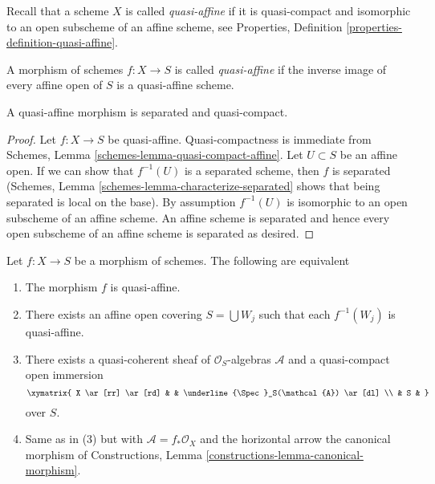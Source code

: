 \noindent
Recall that a scheme $X$ is called {\it quasi-affine} if it is quasi-compact
and isomorphic to an open subscheme of an affine scheme, see
Properties, Definition \ref{properties-definition-quasi-affine}.

\begin{definition}
\label{definition-quasi-affine}
A morphism of schemes $f : X \to S$ is called {\it quasi-affine} if the
inverse image of every affine open of $S$ is a quasi-affine scheme.
\end{definition}

\begin{lemma}
\label{lemma-quasi-affine-separated}
A quasi-affine morphism is separated and quasi-compact.
\end{lemma}

\begin{proof}
Let $f : X \to S$ be quasi-affine.
Quasi-compactness is immediate from
Schemes, Lemma \ref{schemes-lemma-quasi-compact-affine}.
Let $U \subset S$ be an affine open. If we can show that
$f^{-1}(U)$ is a separated scheme, then $f$ is separated
(Schemes, Lemma \ref{schemes-lemma-characterize-separated}
shows that being separated is local on the base).
By assumption $f^{-1}(U)$ is isomorphic to an open subscheme
of an affine scheme. An affine scheme is separated and hence
every open subscheme of an affine scheme is separated as desired.
\end{proof}

\begin{lemma}
\label{lemma-characterize-quasi-affine}
Let $f : X \to S$ be a morphism of schemes.
The following are equivalent
\begin{enumerate}
\item The morphism $f$ is quasi-affine.
\item There exists an affine open covering $S = \bigcup W_j$
such that each $f^{-1}(W_j)$ is quasi-affine.
\item There exists a quasi-coherent sheaf of $\mathcal{O}_S$-algebras
$\mathcal{A}$ and a quasi-compact open immersion
$$
\xymatrix{
X \ar[rr] \ar[rd] & & \underline{\Spec}_S(\mathcal{A}) \ar[dl] \\
& S &
}
$$
over $S$.
\item Same as in (3) but with $\mathcal{A} = f_*\mathcal{O}_X$
and the horizontal arrow the canonical morphism of
Constructions, Lemma \ref{constructions-lemma-canonical-morphism}.
\end{enumerate}
\end{lemma}


